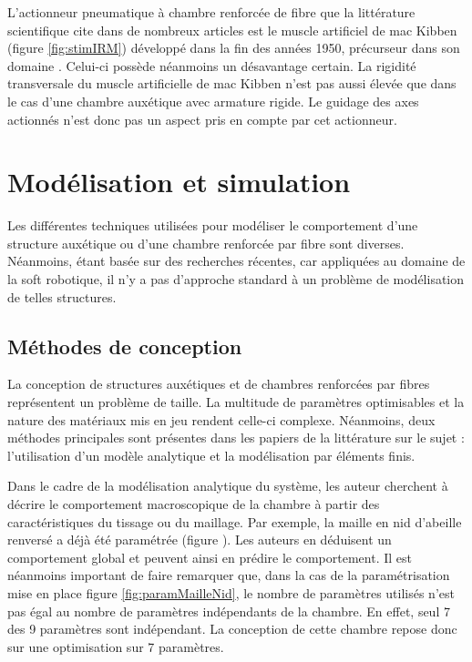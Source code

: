 \documentclass[10pt, a4paper]{article}
\begin{document}
    L'actionneur pneumatique à chambre renforcée de fibre que la littérature scientifique cite dans de nombreux articles est le muscle artificiel de mac Kibben (figure \ref{fig:stimIRM}) développé dans la fin des années 1950, précurseur dans son domaine \cite{Lambert2016} \cite{Takashima2010} \cite{Daerden2002} \cite{Doumit2009} \cite{Zhang2012} \cite{Chou1996}. Celui-ci possède néanmoins un désavantage certain. La rigidité transversale du muscle artificielle de mac Kibben n'est pas aussi élevée que dans le cas d'une chambre auxétique avec armature rigide. Le guidage des axes actionnés n'est donc pas un aspect pris en compte par cet actionneur.

\section{Modélisation et simulation}
    
    Les différentes techniques utilisées pour modéliser le comportement d'une structure auxétique ou d'une chambre renforcée par fibre sont diverses. Néanmoins, étant basée sur des recherches récentes, car appliquées au domaine de la soft robotique, il n'y a pas d'approche standard à un problème de modélisation de telles structures.
    
    \subsection{Méthodes de conception}
    
        La conception de structures auxétiques et de chambres renforcées par fibres représentent un problème de taille. La multitude de paramètres optimisables et la nature des matériaux mis en jeu rendent celle-ci complexe. Néanmoins, deux méthodes principales sont présentes dans les papiers de la littérature sur le sujet \cite{Sedal2018} \cite{Sedal2018a} \cite{Connolly2017} \cite{AlvarezElipe2012} \cite{Naboni2015} \cite{Karnessis2013} \cite{Chou1996} \cite{Doumit2009} \cite{Polygerinos2015} \cite{Pfeil2018}: l'utilisation d'un modèle analytique et la modélisation par éléments finis.

        Dans le cadre de la modélisation analytique du système, les auteur cherchent à décrire le comportement macroscopique de la chambre à partir des caractéristiques du tissage ou du maillage. Par exemple, la maille en nid d'abeille renversé a déjà été paramétrée \cite{Karnessis2013} \cite{Pfeil2018} (figure ). Les auteurs en déduisent un comportement global et peuvent ainsi en prédire le comportement. Il est néanmoins important de faire remarquer que, dans la cas de la paramétrisation mise en place figure \ref{fig:paramMailleNid}, le nombre de paramètres utilisés n'est pas égal au nombre de paramètres indépendants de la chambre. En effet, seul 7 des 9 paramètres sont indépendant. La conception de cette chambre repose donc sur une optimisation sur 7 paramètres.
\end{document}
